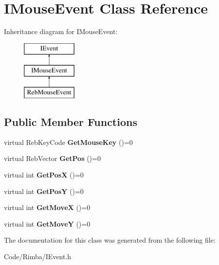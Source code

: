 \hypertarget{class_i_mouse_event}{}\section{I\+Mouse\+Event Class Reference}
\label{class_i_mouse_event}
Inheritance diagram for I\+Mouse\+Event\+:\begin{figure}[H]
\begin{center}
\leavevmode
\includegraphics[height=3.000000cm]{class_i_mouse_event}
\end{center}
\end{figure}
\subsection*{Public Member Functions}
\begin{DoxyCompactItemize}
\item 
virtual Reb\+Key\+Code {\bfseries Get\+Mouse\+Key} ()=0\hypertarget{class_i_mouse_event_a19eaee1abd03bde73f7dd82485974b37}{}\label{class_i_mouse_event_a19eaee1abd03bde73f7dd82485974b37}

\item 
virtual Reb\+Vector {\bfseries Get\+Pos} ()=0\hypertarget{class_i_mouse_event_aac99d8e620bc14e42423380223ede2c9}{}\label{class_i_mouse_event_aac99d8e620bc14e42423380223ede2c9}

\item 
virtual int {\bfseries Get\+PosX} ()=0\hypertarget{class_i_mouse_event_a7e756004af212d5b328eab2720ae610e}{}\label{class_i_mouse_event_a7e756004af212d5b328eab2720ae610e}

\item 
virtual int {\bfseries Get\+PosY} ()=0\hypertarget{class_i_mouse_event_ac29224c0cbca1989c51775f6690f10ec}{}\label{class_i_mouse_event_ac29224c0cbca1989c51775f6690f10ec}

\item 
virtual int {\bfseries Get\+MoveX} ()=0\hypertarget{class_i_mouse_event_a4f870ca90e0d659ff34f5cf7bba7dacf}{}\label{class_i_mouse_event_a4f870ca90e0d659ff34f5cf7bba7dacf}

\item 
virtual int {\bfseries Get\+MoveY} ()=0\hypertarget{class_i_mouse_event_a4d24e7ee9ce321d2e704d81386f973ea}{}\label{class_i_mouse_event_a4d24e7ee9ce321d2e704d81386f973ea}

\end{DoxyCompactItemize}


The documentation for this class was generated from the following file\+:\begin{DoxyCompactItemize}
\item 
Code/\+Rimba/I\+Event.\+h\end{DoxyCompactItemize}

